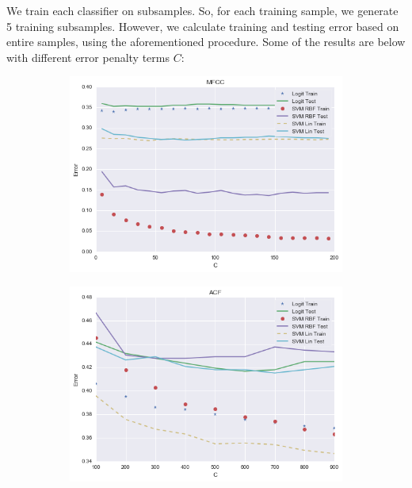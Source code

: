 \documentclass[journal]{IEEEtran}
\begin{document}
We train each classifier on subsamples. So, for each training sample, we generate 5 training subsamples. However, we calculate training and testing error based on entire samples, using the aforementioned procedure. Some of the results are below with different error penalty terms $C$:
\begin{figure}[H]
\centering
\begin{subfigure}{0.5\linewidth}
\centering
\includegraphics[width=0.9\linewidth]{MFCC_Err}
\end{subfigure}\hfill
\begin{subfigure}{0.5\linewidth}
\centering
\includegraphics[width=0.9\linewidth]{ACF_Err}
\end{subfigure}
\end{figure}
\end{document}
